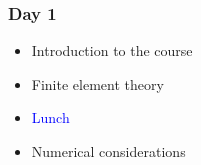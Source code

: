 
\begin{frame}
  \frametitle{Day 1}
  \begin{itemize}[]
  \item[] Introduction to the course
  \item[] Finite element theory
  \item[] \textcolor{blue}{Lunch}
  \item[] Numerical considerations
  \end{itemize}
\end{frame}
